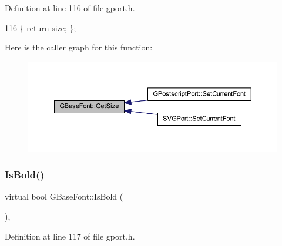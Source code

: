 Definition at line 116 of file gport.\+h.


\begin{DoxyCode}
116 \{ \textcolor{keywordflow}{return} \mbox{\hyperlink{class_g_base_font_a3665d1d315cccd1d1487eed589a8da0f}{size}}; \};
\end{DoxyCode}
Here is the caller graph for this function\+:\nopagebreak
\begin{figure}[H]
\begin{center}
\leavevmode
\includegraphics[width=350pt]{class_g_base_font_a62e761a8a0c0f60f01d8a0d451640e69_icgraph}
\end{center}
\end{figure}
\mbox{\label{class_g_base_font_a22abd1f8dfcda6124ffedb8dc26bfcd3}} 
\subsubsection{\texorpdfstring{Is\+Bold()}{IsBold()}}
{\footnotesize\ttfamily virtual bool G\+Base\+Font\+::\+Is\+Bold (\begin{DoxyParamCaption}{ }\end{DoxyParamCaption})\hspace{0.3cm}{\ttfamily [inline]}, {\ttfamily [virtual]}}



Definition at line 117 of file gport.\+h.



